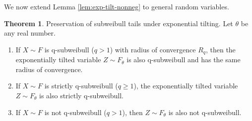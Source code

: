 \documentclass{article}
\theoremstyle{definition}
\newtheorem{theorem}{Theorem}[section]
\DeclareMathOperator{\E}{\mathbb{E}}
\begin{document}
We now extend Lemma \ref{lem:exp-tilt-nonneg} to general random variables. 

\begin{theorem}
\label{thm:exp-tilt-general}
Preservation of subweibull tails under exponential tilting. Let $\theta$ be any real number.
\begin{enumerate}
 \item If $X\sim F$ is q-subweibull ($q>1$) with radius of convergence $R_q$, then the exponentially tilted variable $Z\sim F_\theta$ is also q-subweibull and has the same radius of convergence.
 \item If $X\sim F$ is strictly q-subweibull ($q\geq1$), the exponentially tilted variable $Z\sim F_\theta$ is also strictly q-subweibull.
 \item If $X\sim F$ is not q-subweibull ($q>1$), then $Z\sim F_\theta$ is also not q-subweibull.
\end{enumerate}
\end{theorem}
\end{document}
